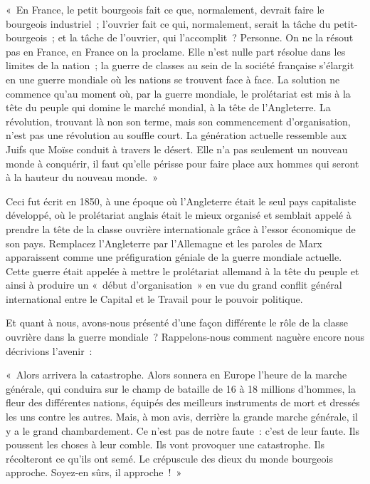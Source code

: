 \documentclass[french,twoside]{book} %
\newenvironment{quoteblock}%
  {\begin{quoting}}
  {\end{quoting}}
\newenvironment{quotebar}{%
    \def\FrameCommand{{\color{rubric!10!}\vrule width 0.5em} \hspace{0.9em}}%
    \def\OuterFrameSep{\itemsep} %
    \MakeFramed {\advance\hsize-\width \FrameRestore}
  }%
  {%
    \endMakeFramed
  }
\renewenvironment{quoteblock}%
  {%
    \savenotes
    \setstretch{0.9}
    \normalfont
    \begin{quotebar}
  }
  {%
    \end{quotebar}
    \spewnotes
  }
\begin{document}
\begin{quoteblock}
 \noindent « En France, le petit bourgeois fait ce que, normalement, devrait faire le bourgeois industriel ; l’ouvrier fait ce qui, normalement, serait la tâche du petit-bourgeois ; et la tâche de l’ouvrier, qui l’accomplit ? Personne. On ne la résout pas en France, en France on la proclame. Elle n’est nulle part résolue dans les limites de la nation ; la guerre de classes au sein de la société française s’élargit en une guerre mondiale où les nations se trouvent face à face. La solution ne commence qu’au moment où, par la guerre mondiale, le prolétariat est mis à la tête du peuple qui domine le marché mondial, à la tête de l’Angleterre. La révolution, trouvant là non son terme, mais son commencement d’organisation, n’est pas une révolution au souffle court. La génération actuelle ressemble aux Juifs que Moïse conduit à travers le désert. Elle n’a pas seulement un nouveau monde à conquérir, il faut qu’elle périsse pour faire place aux hommes qui seront à la hauteur du nouveau monde. »
\end{quoteblock}

\noindent Ceci fut écrit en 1850, à une époque où l’Angleterre était le seul pays capitaliste développé, où le prolétariat anglais était le mieux organisé et semblait appelé à prendre la tête de la classe ouvrière internationale grâce à l’essor économique de son pays. Remplacez l’Angleterre par l’Allemagne et les paroles de Marx apparaissent comme une préfiguration géniale de la guerre mondiale actuelle. Cette guerre était appelée à mettre le prolétariat allemand à la tête du peuple et ainsi à produire un « début d’organisation » en vue du grand conflit général international entre le Capital et le Travail pour le pouvoir politique.\par
Et quant à nous, avons-nous présenté d’une façon différente le rôle de la classe ouvrière dans la guerre mondiale ? Rappelons-nous comment naguère encore nous décrivions l’avenir :\par

\begin{quoteblock}
 \noindent « Alors arrivera la catastrophe. Alors sonnera en Europe l’heure de la marche générale, qui conduira sur le champ de bataille de 16 à 18 millions d’hommes, la fleur des différentes nations, équipés des meilleurs instruments de mort et dressés les uns contre les autres. Mais, à mon avis, derrière la grande marche générale, il y a le grand chambardement. Ce n’est pas de notre faute : c’est de leur faute. Ils poussent les choses à leur comble. Ils vont provoquer une catastrophe. Ils récolteront ce qu’ils ont semé. Le crépuscule des dieux du monde bourgeois approche. Soyez-en sûrs, il approche ! »
\end{quoteblock}
\end{document}
